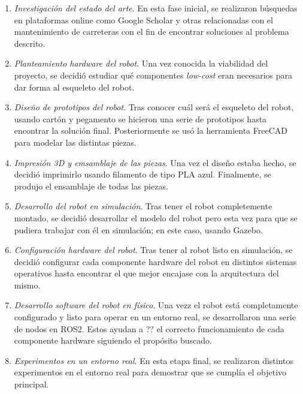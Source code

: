 \begin{enumerate}
	\item{\textit{Investigación del estado del arte}}. En esta fase inicial, se realizaron búsquedas en plataformas online como Google Scholar y otras relacionadas con el mantenimiento de carreteras con el fin de encontrar soluciones al problema descrito. 
	
	\item{\textit{Planteamiento hardware del robot}}. Una vez conocida la viabilidad del proyecto, se decidió estudiar qué componentes \textit{low-cost} eran necesarios para dar forma al esqueleto del robot. 
	
	\item{\textit{Diseño de prototipos del robot}}. Tras conocer cuál será el esqueleto del robot, usando cartón y pegamento se hicieron una serie de prototipos hasta encontrar la solución final. Posteriormente se usó la herramienta FreeCAD para modelar las distintas piezas.
	
	\item{\textit{Impresión 3D y emsamblaje de las piezas}}. Una vez el diseño estaba hecho, se decidió imprimirlo usando filamento de tipo PLA azul. Finalmente, se produjo el ensamblaje de todas las piezas.
	
	\item{\textit{Desarrollo del robot en simulación}}. Tras tener el robot completemente montado, se decidió desarrollar el modelo del robot pero esta vez para que se pudiera trabajar con él en simulación; en este caso, usando Gazebo.
	
	\item{\textit{Configuración hardware del robot}}. Tras tener al robot listo en simulación, se decidió configurar cada componente hardware del robot en distintos sistemas operativos hasta encontrar el que mejor encajase con la arquitectura del mismo. 
	
	\item{\textit{Desarrollo software del robot en físico}}. Una vezz el robot está completamente configurado y listo para operar en un entorno real, se desarrollaron una serie de nodos en ROS2. Estos ayudan a ?? el correcto funcionamiento de cada componente hardware siguiendo el propósito buscado. 
	
	\item{\textit{Experimentos en un entorno real}}. En esta etapa final, se realizaron distintos experimentos en el entorno real para demostrar que se cumplía el objetivo principal.

\end{enumerate}

